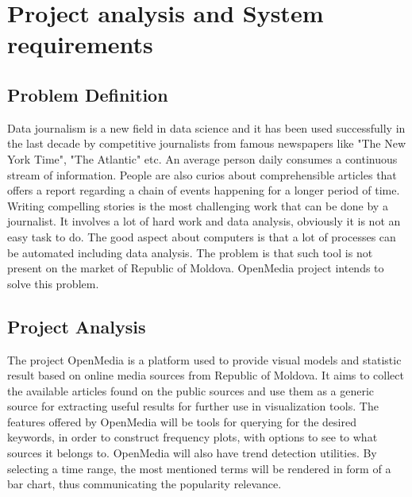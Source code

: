 \section{Project analysis and System requirements}

\subsection{Problem Definition}
Data journalism is a new field in data science and it has been used  successfully in the last decade by competitive journalists from famous newspapers like "The New York Time", "The Atlantic" etc. An average person daily consumes a continuous stream of information. People are also curios about comprehensible articles that offers a report regarding a chain of events happening for a longer period of time. Writing compelling stories is the most challenging work that can be done by a journalist. It involves a lot of hard work and data analysis, obviously it is not an easy task to do. The good aspect about computers is that a lot of processes can be automated including data analysis. The problem is that such tool is not present on the market of Republic of Moldova. OpenMedia project intends to solve this problem.

\subsection{Project Analysis}
The project OpenMedia is a platform used to provide visual models and statistic result based on online media sources from Republic of Moldova. It aims to collect the available articles found on the public sources and use them as a generic source for extracting useful results for further use in visualization tools. The features offered by OpenMedia will be tools for querying for the desired keywords, in order to construct frequency plots, with options to see to what sources it belongs to. OpenMedia will also have trend detection utilities. By selecting a time range, the most mentioned terms will be rendered in form of a bar chart, thus communicating the popularity relevance.

